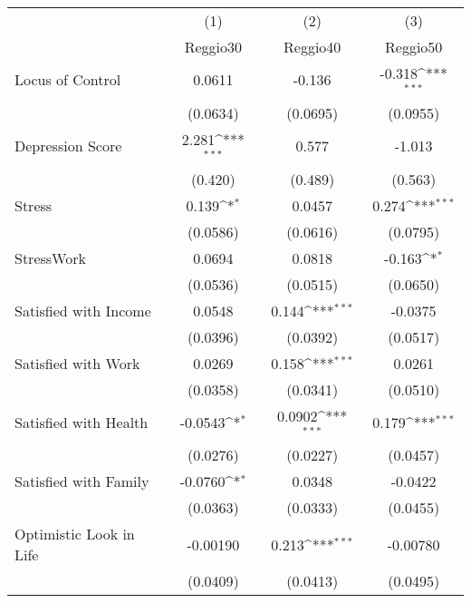 {
\def\sym#1{\ifmmode^{#1}\else\(^{#1}\)\fi}
\begin{tabular}{l*{3}{c}}
\hline\hline
            &\multicolumn{1}{c}{(1)}&\multicolumn{1}{c}{(2)}&\multicolumn{1}{c}{(3)}\\
            &\multicolumn{1}{c}{Reggio30}&\multicolumn{1}{c}{Reggio40}&\multicolumn{1}{c}{Reggio50}\\
\hline
Locus of Control&      0.0611         &      -0.136         &      -0.318\sym{***}\\
            &    (0.0634)         &    (0.0695)         &    (0.0955)         \\
[1em]
Depression Score&       2.281\sym{***}&       0.577         &      -1.013         \\
            &     (0.420)         &     (0.489)         &     (0.563)         \\
[1em]
Stress      &       0.139\sym{*}  &      0.0457         &       0.274\sym{***}\\
            &    (0.0586)         &    (0.0616)         &    (0.0795)         \\
[1em]
StressWork  &      0.0694         &      0.0818         &      -0.163\sym{*}  \\
            &    (0.0536)         &    (0.0515)         &    (0.0650)         \\
[1em]
Satisfied with Income&      0.0548         &       0.144\sym{***}&     -0.0375         \\
            &    (0.0396)         &    (0.0392)         &    (0.0517)         \\
[1em]
Satisfied with Work&      0.0269         &       0.158\sym{***}&      0.0261         \\
            &    (0.0358)         &    (0.0341)         &    (0.0510)         \\
[1em]
Satisfied with Health&     -0.0543\sym{*}  &      0.0902\sym{***}&       0.179\sym{***}\\
            &    (0.0276)         &    (0.0227)         &    (0.0457)         \\
[1em]
Satisfied with Family&     -0.0760\sym{*}  &      0.0348         &     -0.0422         \\
            &    (0.0363)         &    (0.0333)         &    (0.0455)         \\
[1em]
Optimistic Look in Life&    -0.00190         &       0.213\sym{***}&    -0.00780         \\
            &    (0.0409)         &    (0.0413)         &    (0.0495)         \\

\end{tabular}}
